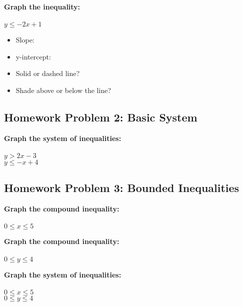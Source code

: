 \documentclass[12pt]{article}
\begin{document}
			\vspace{4cm}
		
		    \textbf{Graph the inequality:}\\\\
			$y \leq -2x + 1$
			\begin{itemize}
				\item Slope: \underline{\hspace{1in}}
	    		\item y-intercept: \underline{\hspace{1in}}
				\item Solid or dashed line? \underline{\hspace{2in}}
				\item Shade above or below the line? \underline{\hspace{2in}}
			\end{itemize}
				
        	\newpage
	
    	\subsection*{Homework Problem 2: Basic System}
		
            \textbf{Graph the system of inequalities:}\\\\
			$y > 2x - 3$\\
			$y \leq -x + 4$\\
	
	        \newpage
	
	    \subsection*{Homework Problem 3: Bounded Inequalities}
		
            \textbf{Graph the compound inequality:}\\\\
			$0 \leq x \leq 5$\\
			
		    \vspace{4.5cm}
			
		    \textbf{Graph the compound inequality:}\\\\
			$0 \leq y \leq 4$\\
			
		    \vspace{4.5cm}
		
		    \textbf{Graph the system of inequalities:}\\\\
			$0 \leq x \leq 5$\\
			$0 \leq y \leq 4$\\
			
\end{document}
